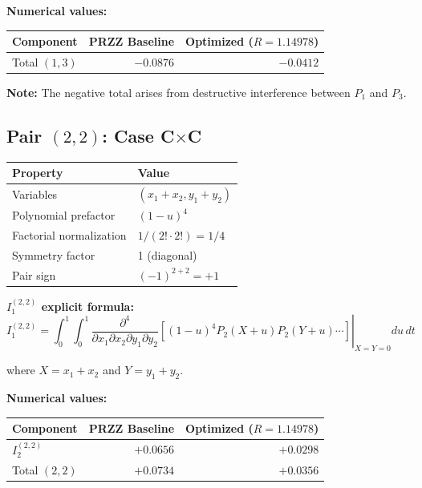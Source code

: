 \documentclass[11pt]{article}
\begin{document}
\textbf{Numerical values:}

\begin{center}
\begin{tabular}{lrr}
\toprule
Component & PRZZ Baseline & Optimized ($R=1.14978$) \\
\midrule
Total $(1,3)$ & $-0.0876$ & $-0.0412$ \\
\bottomrule
\end{tabular}
\end{center}

\textbf{Note:} The negative total arises from destructive interference between $P_1$ and $P_3$.

\subsection{Pair $(2,2)$: Case C$\times$C}

\begin{center}
\begin{tabular}{ll}
\toprule
Property & Value \\
\midrule
Variables & $(x_1+x_2, y_1+y_2)$ \\
Polynomial prefactor & $(1-u)^4$ \\
Factorial normalization & $1/(2! \cdot 2!) = 1/4$ \\
Symmetry factor & 1 (diagonal) \\
Pair sign & $(-1)^{2+2} = +1$ \\
\bottomrule
\end{tabular}
\end{center}

\textbf{$I_1^{(2,2)}$ explicit formula:}
\begin{equation}
I_1^{(2,2)} = \int_0^1 \int_0^1 \left.\frac{\partial^4}{\partial x_1 \partial x_2 \partial y_1 \partial y_2}\left[(1-u)^4 P_2(X+u) P_2(Y+u) \cdots\right]\right|_{X=Y=0} du\, dt
\end{equation}

where $X = x_1+x_2$ and $Y = y_1+y_2$.

\textbf{Numerical values:}

\begin{center}
\begin{tabular}{lrr}
\toprule
Component & PRZZ Baseline & Optimized ($R=1.14978$) \\
\midrule
$I_2^{(2,2)}$ & $+0.0656$ & $+0.0298$ \\
Total $(2,2)$ & $+0.0734$ & $+0.0356$ \\
\bottomrule
\end{tabular}
\end{center}
\end{document}
